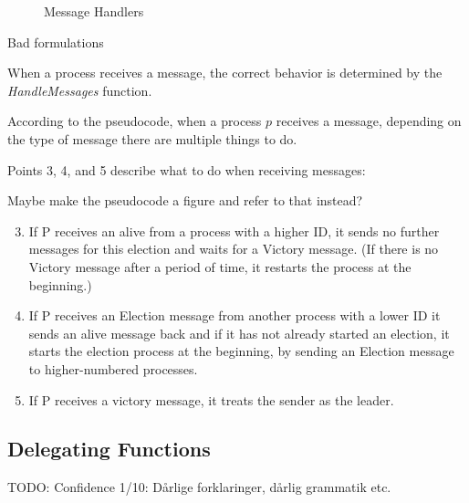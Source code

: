 \documentclass{report}
\begin{document}
\begin{calloutgreen}
\begin{calloutyellow}
\begin{figure}
\fl{}\bottombar\cl{}

\caption{Message Handlers}
\end{figure}

\begin{calloutyellow}
Bad formulations
  \end{calloutyellow}

When a process receives a message, the correct behavior is determined by the \textit{HandleMessages} function.

According to the pseudocode, when a process $p$ receives a message, depending on the type of message there are multiple things to do.

Points 3, 4, and 5 describe what to do when receiving messages:

\begin{callout}
Maybe make the pseudocode a figure and refer to that instead?
  \end{callout}
\begin{enumerate}
  \setcounter{enumi}{2}
  \item If P receives an alive from a process with a higher ID, it sends no further messages for this election and waits for a Victory message. (If there is no Victory message after a period of time, it restarts the process at the beginning.)
  \item If P receives an Election message from another process with a lower ID it sends an alive message back and if it has not already started an election, it starts the election process at the beginning, by sending an Election message to higher-numbered processes.
  \item If P receives a victory message, it treats the sender as the leader.
\end{enumerate}



\subsection{Delegating Functions}
\begin{callout}
TODO: Confidence 1/10: Dårlige forklaringer, dårlig grammatik etc.
\end{callout}

\noindent{}


\end{calloutyellow}
\end{calloutgreen}
\end{document}
